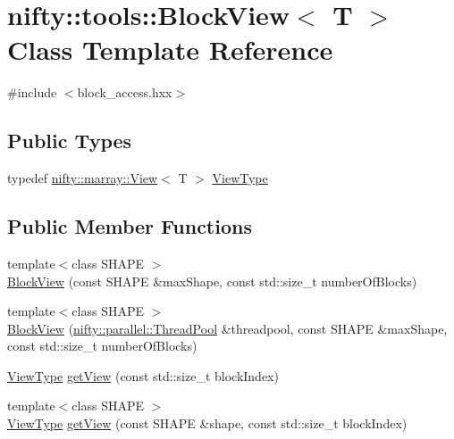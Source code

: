 \hypertarget{classnifty_1_1tools_1_1BlockView}{}\section{nifty\+:\+:tools\+:\+:Block\+View$<$ T $>$ Class Template Reference}
\label{classnifty_1_1tools_1_1BlockView}


{\ttfamily \#include $<$block\+\_\+access.\+hxx$>$}

\subsection*{Public Types}
\begin{DoxyCompactItemize}
\item 
typedef \hyperlink{classandres_1_1View}{nifty\+::marray\+::\+View}$<$ T $>$ \hyperlink{classnifty_1_1tools_1_1BlockView_acaadee9e8a7dc696acf1ebad24bd431d}{View\+Type}
\end{DoxyCompactItemize}
\subsection*{Public Member Functions}
\begin{DoxyCompactItemize}
\item 
{\footnotesize template$<$class S\+H\+A\+P\+E $>$ }\\\hyperlink{classnifty_1_1tools_1_1BlockView_a1b591e8f45f3bed139be4e0c3389120b}{Block\+View} (const S\+H\+A\+P\+E \&max\+Shape, const std\+::size\+\_\+t number\+Of\+Blocks)
\item 
{\footnotesize template$<$class S\+H\+A\+P\+E $>$ }\\\hyperlink{classnifty_1_1tools_1_1BlockView_abb51114af3076842c35284562c13ca72}{Block\+View} (\hyperlink{classnifty_1_1parallel_1_1ThreadPool}{nifty\+::parallel\+::\+Thread\+Pool} \&threadpool, const S\+H\+A\+P\+E \&max\+Shape, const std\+::size\+\_\+t number\+Of\+Blocks)
\item 
\hyperlink{classnifty_1_1tools_1_1BlockView_acaadee9e8a7dc696acf1ebad24bd431d}{View\+Type} \hyperlink{classnifty_1_1tools_1_1BlockView_abbd30baab53cb89ded00f37214b6056d}{get\+View} (const std\+::size\+\_\+t block\+Index)
\item 
{\footnotesize template$<$class S\+H\+A\+P\+E $>$ }\\\hyperlink{classnifty_1_1tools_1_1BlockView_acaadee9e8a7dc696acf1ebad24bd431d}{View\+Type} \hyperlink{classnifty_1_1tools_1_1BlockView_aa5844a6a85c4747084f64e44f1456fe7}{get\+View} (const S\+H\+A\+P\+E \&shape, const std\+::size\+\_\+t block\+Index)
\end{DoxyCompactItemize}


